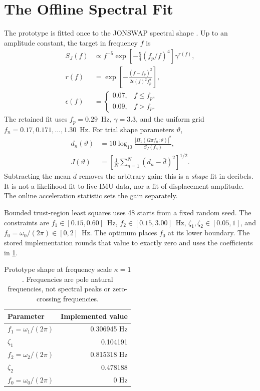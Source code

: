 \documentclass[conference]{IEEEtran}
\begin{document}
\section{The Offline Spectral Fit}
\label{sec:fit}
The prototype is fitted once to the JONSWAP spectral shape
\cite{jonswap}. Up to an amplitude constant, the target in frequency $f$ is
\begin{align}
 S_J(f)&\propto f^{-5}\exp\!\left[-\frac54(f_p/f)^4\right]
                  \gamma^{r(f)},\nonumber\\
 r(f)&=\exp\!\left[-\frac{(f-f_p)^2}{2\epsilon(f)^2f_p^2}\right],\label{eq:jonswap}\\
 \epsilon(f)&=\begin{cases}0.07,&f\le f_p,\\0.09,&f>f_p.\end{cases}\nonumber
\end{align}
The retained fit uses $f_p=0.29$~Hz, $\gamma=3.3$, and the uniform grid
$f_n=0.17,0.171,\ldots,1.30$~Hz. For trial shape parameters $\vartheta$,
\begin{align}
 d_n(\vartheta)&=10\log_{10}
       \frac{|H_1(i2\pi f_n;\vartheta)|^2}{S_J(f_n)},\nonumber\\
 J(\vartheta)&=\left[\frac1N\sum_{n=1}^N
                 (d_n-\bar d)^2\right]^{1/2}.
 \label{eq:fit}
\end{align}
Subtracting the mean $\bar d$ removes the arbitrary gain: this is a
\emph{shape} fit in decibels. It is not a likelihood fit to live IMU data,
nor a fit of displacement amplitude. The online acceleration statistic
sets the gain separately.

Bounded trust-region least squares uses 48 starts from a fixed random
seed. The constraints are
$f_1\in[0.15,0.60]$~Hz, $f_2\in[0.15,3.00]$~Hz,
$\zeta_1,\zeta_2\in[0.05,1]$, and
$f_0=\omega_0/(2\pi)\in[0,2]$~Hz. The optimum places $f_0$ at its lower
boundary. The stored implementation rounds that value to exactly zero
and uses the coefficients in \cref{tab:shape}.

\begin{table}[!t]
\caption{Prototype shape at frequency scale $\kappa=1$. Frequencies are
pole natural frequencies, not spectral peaks or zero-crossing frequencies.}
\label{tab:shape}\centering
\begin{tabular}{@{}lr@{}}\toprule
Parameter & Implemented value \\\midrule
$f_1=\omega_1/(2\pi)$ & 0.306945 Hz \\
$\zeta_1$ & 0.104191 \\
$f_2=\omega_2/(2\pi)$ & 0.815318 Hz \\
$\zeta_2$ & 0.478188 \\
$f_0=\omega_0/(2\pi)$ & 0 Hz \\\bottomrule
\end{tabular}
\end{table}
\end{document}
